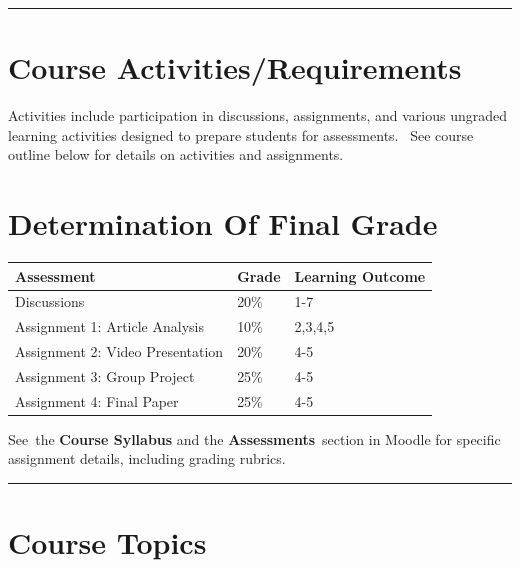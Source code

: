 \documentclass[
]{book}
\begin{document}
\begin{center}\rule{0.5\linewidth}{0.5pt}\end{center}

\hypertarget{course-activitiesrequirements}{%
\section*{Course Activities/Requirements}\label{course-activitiesrequirements}}

Activities include participation in discussions, assignments, and various ungraded learning activities designed to prepare students for assessments.~ See course outline below for details on activities and assignments.

\hypertarget{determination-of-final-grade}{%
\section*{Determination Of Final Grade}\label{determination-of-final-grade}}

\begin{longtable}[]{@{}lll@{}}
\toprule()
\textbf{Assessment} & \textbf{Grade} & Learning Outcome \\
\midrule()
\endhead
Discussions & 20\% & 1-7 \\
Assignment 1: Article Analysis & 10\% & 2,3,4,5 \\
Assignment 2: Video Presentation & 20\% & 4-5 \\
Assignment 3: Group Project & 25\% & 4-5 \\
Assignment 4: Final Paper & 25\% & 4-5 \\
\bottomrule()
\end{longtable}

See~the \textbf{Course Syllabus} and the \textbf{Assessments}~section in Moodle for specific assignment details, including
grading rubrics.

\begin{center}\rule{0.5\linewidth}{0.5pt}\end{center}

\hypertarget{course-topics}{%
\section*{Course Topics}\label{course-topics}}
\end{document}
